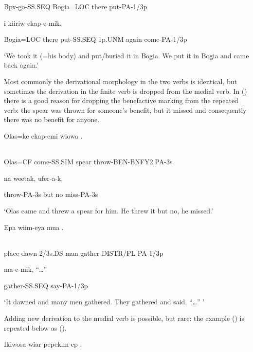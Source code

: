 Bpx-go-SS.SEQ  Bogia=LOC  there  put-PA-1/3p

  i  kiiriw  ekap-e-mik.

Bogia=LOC  there  put-SS.SEQ  1p.UNM  again  come-PA-1/3p

`We took it (=his body) and put/buried it in Bogia. We put it in Bogia and came back again.'

Most commonly the derivational morphology in the two verbs is identical, but sometimes the derivation in the finite verb is dropped from the medial verb. In () there is a good reason for dropping the benefactive marking from the repeated verb: the spear was thrown for someone's benefit, but it missed and consequently there was no benefit for anyone.

\ea%
\label{ex:x1513}
\gll Olas=ke  ekap-emi  wiowa  . \\
      \\
\glt
\z

Olas=CF  come-SS.SIM  spear  throw-BEN-BNFY2.PA-3s

  na  weetak,  ufer-a-k.

throw-PA-3s  but  no  miss-PA-3s

`Olas came and threw a spear for him. He threw it but no, he missed.'

\ea%
\label{ex:x1514}
\gll Epa  wiim-eya  mua  . \\
      \\
\glt
\z

place  dawn-2/3s.DS  man  gather-DISTR/PL-PA-1/3p

  ma-e-mik,  ``{\dots''}

gather-SS.SEQ  say-PA-1/3p

`It dawned and many men gathered. They gathered and said, ``{\dots}'' '

Adding new derivation to the medial verb is possible, but rare: the example () is repeated below as ().

\ea%
\label{ex:x1515}
\gll Ikiwosa  wiar  pepekim-ep  .   \\
      \\
\glt
\z

